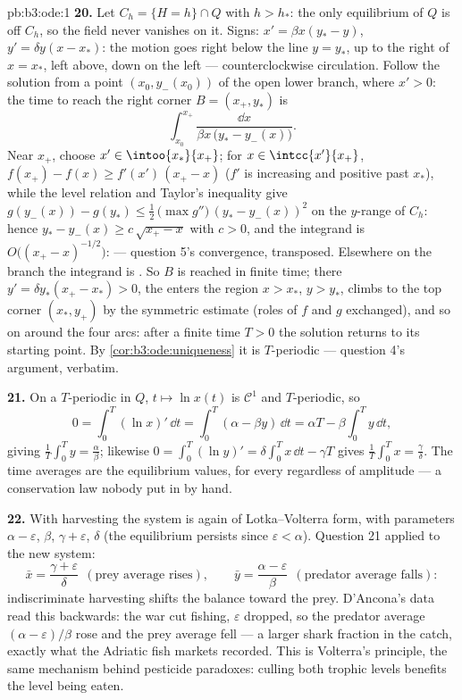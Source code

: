 \begin{solution}{pb:b3:ode:1}
\textbf{20.} Let $C_h = \{H = h\}\cap Q$ with $h > h_*$: the
only equilibrium of $Q$ is off $C_h$, so the field never
vanishes on it. Signs: $x' = \beta x(y_* - y)$, $y' =
\delta y(x - x_*)$: the motion goes right below the line $y
= y_*$, up to the right of $x = x_*$, left above, down on
the left --- counterclockwise circulation. Follow the
solution from a point $(x_0, y_-(x_0))$ of the open lower
branch, where $x' > 0$: the time to reach the right corner
$B = (x_+, y_*)$ is
\[
\int_{x_0}^{x_+}\frac{\dd x}{\beta x\,\bigl(y_* -
y_-(x)\bigr)} .
\]
Near $x_+$, choose $x' \in \intoo{x_*}{x_+}$; for $x \in
\intcc{x'}{x_+}$, $f(x_+) - f(x) \geq f'(x')\,(x_+ - x)$
($f'$ is increasing and positive past $x_*$), while the
level relation and Taylor's inequality give $g(y_-(x)) -
g(y_*) \leq \frac12\,\bigl(\max g''\bigr)\,(y_* -
y_-(x))^2$ on the  $y$-range of $C_h$: hence $y_* -
y_-(x) \geq c\,\sqrt{x_+ - x}$ with $c > 0$, and the
integrand is $O\bigl((x_+ - x)^{-1/2}\bigr)$:  ---
question 5's convergence, transposed. Elsewhere on the
branch the integrand is . So $B$ is reached in
finite time; there $y' = \delta y_*(x_+ - x_*) > 0$, the
 enters the region $x > x_*$, $y > y_*$, climbs to the
top corner $(x_*, y_+)$ by the symmetric estimate (roles of
$f$ and $g$ exchanged), and so on around the four arcs:
after a finite time $T > 0$ the solution returns to its
starting point. By \cref{cor:b3:ode:uniqueness} it is
$T$-periodic --- question 4's argument, verbatim.

\textbf{21.} On a $T$-periodic  in $Q$, $t \mapsto \ln
x(t)$ is $\mathcal C^1$ and $T$-periodic, so
\[
0 = \int_0^T(\ln x)'\,\dd t
= \int_0^T(\alpha - \beta y)\,\dd t
= \alpha T - \beta\int_0^Ty\,\dd t ,
\]
giving $\frac1T\int_0^Ty = \frac\alpha\beta$; likewise $0 =
\int_0^T(\ln y)' = \delta\int_0^Tx\,\dd t - \gamma T$ gives
$\frac1T\int_0^Tx = \frac\gamma\delta$. The time averages
are the equilibrium values, for every  regardless of
amplitude --- a conservation law nobody put in by hand.

\textbf{22.} With harvesting the system is again of
Lotka--Volterra form, with parameters $\alpha -
\varepsilon$, $\beta$, $\gamma + \varepsilon$, $\delta$ (the
 equilibrium persists since $\varepsilon <
\alpha$). Question 21 applied to the new system:
\[
\bar x = \frac{\gamma + \varepsilon}{\delta}
\ \ (\text{prey average rises}),
\qquad
\bar y = \frac{\alpha - \varepsilon}{\beta}
\ \ (\text{predator average falls}) :
\]
indiscriminate harvesting shifts the balance toward the
prey. D'Ancona's data read this backwards: the war cut
fishing, $\varepsilon$ dropped, so the predator average
$(\alpha - \varepsilon)/\beta$ rose and the prey average
fell --- a larger shark fraction in the catch, exactly what
the Adriatic fish markets recorded. This is Volterra's
principle, the same mechanism behind pesticide paradoxes:
culling both trophic levels benefits the level being eaten.


\end{solution}
